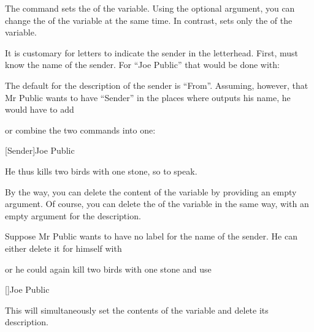 \begin{Declaration}
\end{Declaration}
The  command sets the  of the 
variable. Using the optional argument, you can change the 
of the variable at the same time. In contrast,  sets only
the  of the  variable.
\begin{Example}
  It is customary for letters to indicate the sender in the letterhead.
  First, \KOMAScript{} must know the name of the sender. For
  ``Joe Public'' that would be done with:
\begin{lstcode}
\end{lstcode}
  The default for the description of the sender is ``From''. Assuming,
  however, that Mr Public wants to have ``Sender'' in the places where
  \KOMAScript{} outputs his name, he would have to add
\begin{lstcode}
\end{lstcode}
  or combine the two commands into one:
\begin{lstcode}
  [Sender]{Joe Public}
\end{lstcode}
  He thus kills two birds with one stone, so to speak.
\end{Example}
By the way, you can delete the content of the variable by providing an empty
 argument. Of course, you can delete the  of
the variable in the same way, with an empty argument for the description.
\begin{Example}
  Suppose Mr Public wants to have no label for the name of the sender. He can
  either delete it for himself with
\begin{lstcode}
\end{lstcode}
  or he could again kill two birds with one stone and use
\begin{lstcode}
  []{Joe Public}
\end{lstcode}
  This will simultaneously set the contents of the variable and delete its
  description.
\end{Example}
%
\EndIndexGroup


